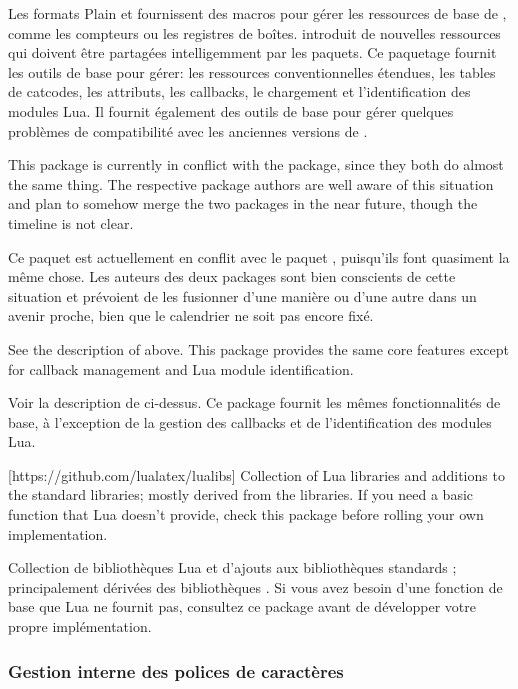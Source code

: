 \documentclass{lltxdoc}
\begin{document}
Les formats Plain et \latex fournissent des macros pour gérer les ressources de base de \tex, comme les compteurs ou les registres de boîtes. \luatex introduit de nouvelles ressources qui doivent être partagées intelligemment par les paquets. Ce paquetage fournit les outils de base pour gérer: les ressources \tex conventionnelles étendues, les tables de catcodes, les attributs, les callbacks, le chargement et l'identification des modules Lua. Il fournit également des outils de base pour gérer quelques problèmes de compatibilité avec les anciennes versions de \luatex.

 This package is currently in conflict with the 
package, since they both do almost the same thing. The respective package
authors are well aware of this situation and plan to somehow merge the two
packages in the near future, though the timeline is not clear.

 Ce paquet est actuellement en conflit avec le paquet , puisqu'ils font quasiment la même chose. Les auteurs des deux packages sont bien conscients de cette situation et prévoient de les fusionner d'une manière ou d'une autre dans un avenir proche, bien que le calendrier ne soit pas encore fixé.

See the description of  above. This package provides the same
core features except for callback management and Lua module identification.

Voir la description de  ci-dessus. Ce package fournit les mêmes fonctionnalités de base, à l'exception de la gestion des callbacks et de l'identification des modules Lua.

[https://github.com/lualatex/lualibs]
Collection of Lua libraries and additions to the standard libraries; mostly
derived from the \context libraries. If you need a basic function that Lua
doesn't provide, check this package before rolling your own implementation.

Collection de bibliothèques Lua et d'ajouts aux bibliothèques standards ; principalement dérivées des bibliothèques \context. Si vous avez besoin d'une fonction de base que Lua ne fournit pas, consultez ce package avant de développer votre propre implémentation.

\subsubsection{Gestion interne des polices de caractères}\label{fontint}
\end{document}
